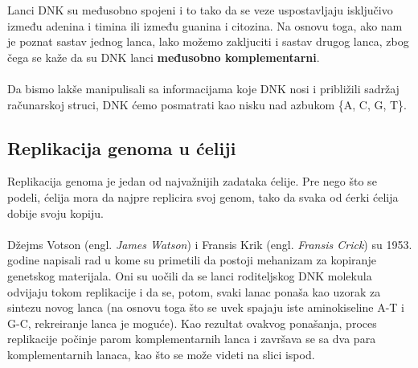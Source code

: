 Lanci DNK su međusobno spojeni i to tako da se veze uspostavljaju isključivo između adenina i timina ili između guanina i citozina. Na osnovu toga, ako nam je poznat sastav jednog lanca, lako možemo zakljuciti i sastav drugog lanca, zbog čega se kaže da su DNK lanci \textbf{međusobno komplementarni}.\\\\
Da bismo lakše manipulisali sa informacijama koje DNK nosi i približili sadržaj računarskoj struci, DNK ćemo posmatrati kao nisku nad azbukom \{A, C, G, T\}.

\subsection{Replikacija genoma u ćeliji}
Replikacija genoma je jedan od najvažnijih zadataka ćelije. Pre nego što se podeli, ćelija mora da najpre replicira svoj genom, tako da svaka od ćerki ćelija dobije svoju kopiju. \\\\
Džejms Votson (engl. \textit{James Watson}) i Fransis Krik (engl. \textit{Fransis Crick}) su 1953. godine napisali rad u kome su primetili da postoji mehanizam za kopiranje genetskog materijala. Oni su uočili da se lanci roditeljskog DNK molekula odvijaju tokom replikacije i da se, potom, svaki lanac ponaša kao uzorak za sintezu novog lanca (na osnovu toga što se uvek spajaju iste aminokiseline A-T i G-C, rekreiranje lanca je moguće). Kao rezultat ovakvog ponašanja, proces replikacije počinje parom komplementarnih lanca i završava se sa dva para komplementarnih lanaca, kao što se može videti na slici ispod.\\\\

